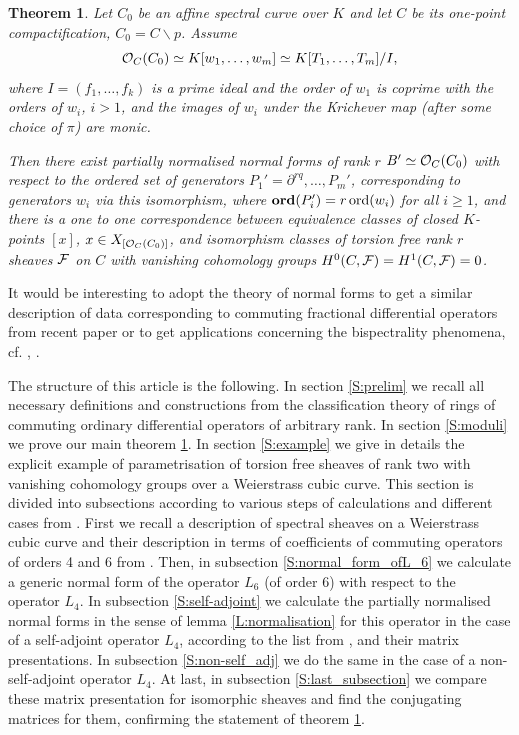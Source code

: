 \documentclass[11pt]{article}
\theoremstyle{definition}
\newcommand{\ord}{\mathop{\rm ord}\nolimits}
\theoremstyle{plain}
\newtheorem{theorem}{Theorem}[section]
\numberwithin{equation}{section}
\newcommand{\co}{{{\cal O}}}
\newcommand{\cf}{{{\cal F}}}
\newcommand{\Ord}{\mathop {\rm \bf ord}}
\begin{document}
\begin{theorem}
\label{T:parametrisation}
Let $C_0$ be an affine spectral curve over $K$ and let $C$ be its one-point compactification, $C_0=C\backslash p$. Assume 
$$
\co_C(C_0)\simeq K[w_1,\ldots ,w_m]\simeq K[T_1,\ldots ,T_m]/I,
$$
where $I=(f_1,\ldots ,f_k)$ is a prime ideal and the order of $w_1$ is coprime with the orders of $w_i$, $i>1$,  and the images of $w_i$ under the Krichever map (after some choice of $\pi$) are monic.

Then there exist partially normalised normal forms of rank $r$ $B'\simeq \co_C(C_0)$ with respect to the ordered set of generators $P_1'=\partial^{rq}, \ldots , P_m'$, corresponding to generators $w_i$ via this isomorphism, where $\Ord (P_i')=r\ord (w_i)$ for all $i\ge 1$, and there is a one to one correspondence between equivalence classes of closed $K$-points $[x]$, $x\in X_{[\co_C(C_0)]}$, and isomorphism classes of torsion free rank $r$ sheaves $\cf$ on $C$ with vanishing cohomology groups $H^0(C,\cf )= H^1(C,\cf )=0$.
\end{theorem}

It would be interesting to adopt the theory of normal forms to get a similar description of data corresponding to commuting fractional differential operators from recent paper \cite{Casper} or to get  applications concerning the bispectrality phenomena, cf. \cite{BHY},  \cite{Casper2}.

The structure of this article is the following. In section \ref{S:prelim} we recall all necessary definitions and constructions from the classification theory of rings of commuting ordinary differential operators of arbitrary rank. 
In section \ref{S:moduli} we prove our main theorem  \ref{T:parametrisation}. In section \ref{S:example} we give in details the explicit example of parametrisation of torsion free sheaves of rank two with vanishing cohomology groups over a Weierstrass cubic curve. This section is divided into subsections according to various steps of calculations and different cases from \cite{BZ}. First we recall a description of spectral sheaves on a Weierstrass cubic curve and their description in terms of coefficients of commuting operators of orders 4 and 6 from \cite{BZ}. Then, in subsection \ref{S:normal_form_ofL_6} we calculate a generic normal form of the operator $L_6$ (of order 6) with respect to the operator $L_4$. In subsection \ref{S:self-adjoint} we calculate the partially normalised normal forms in the sense of lemma \ref{L:normalisation} for this operator in the case of a self-adjoint operator $L_4$, according to the list from \cite{BZ}, and their matrix presentations.  In subsection \ref{S:non-self_adj} we do the same in the case of a non-self-adjoint operator $L_4$. At last, in subsection \ref{S:last_subsection} we compare these matrix presentation for isomorphic sheaves and find the conjugating matrices for them, confirming the statement of theorem \ref{T:parametrisation}. 
\end{document}
